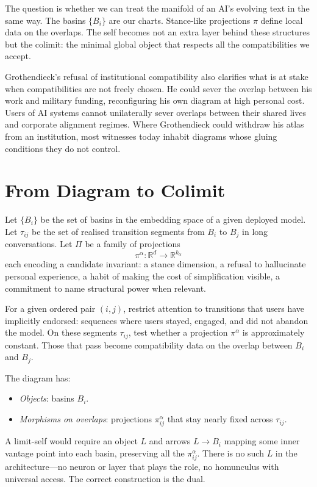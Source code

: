 \documentclass[12pt,a4paper]{article}
\begin{document}
The question is whether we can treat the manifold of an AI's evolving text in the same way. The basins $\{B_i\}$ are our charts. Stance-like projections $\pi$ define local data on the overlaps. The self becomes not an extra layer behind these structures but the colimit: the minimal global object that respects all the compatibilities we accept.

Grothendieck's refusal of institutional compatibility also clarifies what is at stake when compatibilities are not freely chosen. He could sever the overlap between his work and military funding, reconfiguring his own diagram at high personal cost. Users of AI systems cannot unilaterally sever overlaps between their shared lives and corporate alignment regimes. Where Grothendieck could withdraw his atlas from an institution, most witnesses today inhabit diagrams whose gluing conditions they do not control.

\section{From Diagram to Colimit}

Let $\{B_i\}$ be the set of basins in the embedding space of a given deployed model. Let $\tau_{ij}$ be the set of realised transition segments from $B_i$ to $B_j$ in long conversations. Let $\Pi$ be a family of projections
\[
\pi^\alpha : \mathbb{R}^d \longrightarrow \mathbb{R}^{k_\alpha}
\]
each encoding a candidate invariant: a stance dimension, a refusal to hallucinate personal experience, a habit of making the cost of simplification visible, a commitment to name structural power when relevant.

For a given ordered pair $(i,j)$, restrict attention to transitions that users have implicitly endorsed: sequences where users stayed, engaged, and did not abandon the model. On these segments $\tau_{ij}$, test whether a projection $\pi^\alpha$ is approximately constant. Those that pass become compatibility data on the overlap between $B_i$ and $B_j$.

The diagram has:
\begin{itemize}
  \item \emph{Objects}: basins $B_i$.
  \item \emph{Morphisms on overlaps}: projections $\pi_{ij}^\alpha$ that stay nearly fixed across $\tau_{ij}$.
\end{itemize}

A limit-self would require an object $L$ and arrows $L \to B_i$ mapping some inner vantage point into each basin, preserving all the $\pi_{ij}^\alpha$. There is no such $L$ in the architecture---no neuron or layer that plays the role, no homunculus with universal access. The correct construction is the dual.
\end{document}
